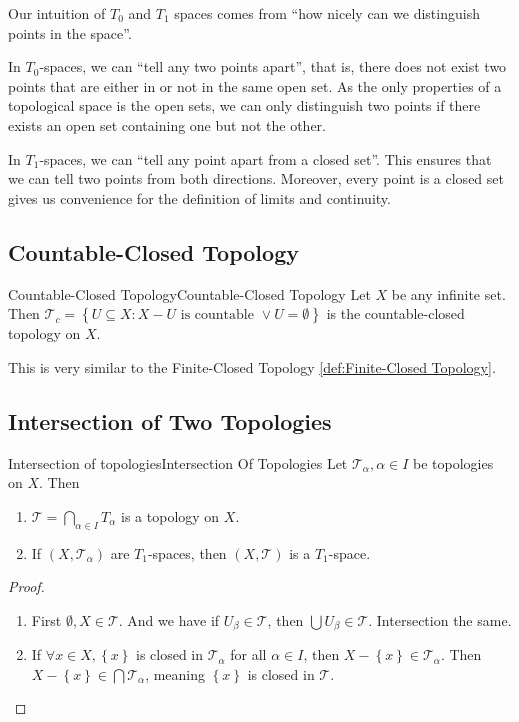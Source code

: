 \documentclass[../main.tex]{subfiles}
\begin{document}
\begin{remark}
Our intuition of $T_0$ and $T_1$ spaces comes from ``how nicely can we distinguish points in the space''. 

In $T_0$-spaces, we can ``tell any two points apart'', that is, there does not exist two points that are either in or not in  the same open set. As the only properties of a topological space is the open sets, we can only distinguish two points if there exists an open set containing one but not the other. 

In $T_1$-spaces, we can ``tell any point apart from a closed set''. This ensures that we can tell two points from both directions. Moreover, every point is a closed set gives us convenience for the definition of limits and continuity.
\end{remark}

\subsection{Countable-Closed Topology}
\begin{definition}{Countable-Closed Topology}{Countable-Closed Topology}
Let $X$ be any infinite set. Then $\mathcal{T}_c = \left\{ U \subseteq X : X-U \text{ is countable }\lor U = \emptyset  \right\}$ is the countable-closed topology on $X$.
\end{definition}
This is very similar to the Finite-Closed Topology \ref{def:Finite-Closed Topology}.

\subsection{Intersection of Two Topologies}
\begin{proposition}{Intersection of topologies}{Intersection Of Topologies}
Let $\mathcal{T}_{\alpha}, \alpha\in I$ be topologies on $X$. Then
\begin{enumerate}
\item $\displaystyle \mathcal{T} = \bigcap_{\alpha\in I} T_{\alpha}$ is a topology on $X$.
\item If $(X,\mathcal{T}_{\alpha})$ are $T_1$-spaces, then $(X, \mathcal{T})$ is a $T_1$-space.
\end{enumerate}
\end{proposition}
\begin{proof}
\begin{enumerate}
\item First $\emptyset ,X\in \mathcal{T}$. And we have if $U_{\beta}\in \mathcal{T}$, then $\bigcup U_{\beta}\in \mathcal{T}$. Intersection the same.
\item If $\forall x\in X, \left\{ x \right\}$ is closed in $\mathcal{T}_{\alpha}$ for all $\alpha\in I$, then $X-\left\{ x \right\}\in \mathcal{T}_{\alpha}$. Then $X-\left\{ x \right\}\in \bigcap \mathcal{T}_{\alpha}$, meaning $\left\{ x \right\}$ is closed in $\mathcal{T}$.
\end{enumerate}
\end{proof}
\end{document}
